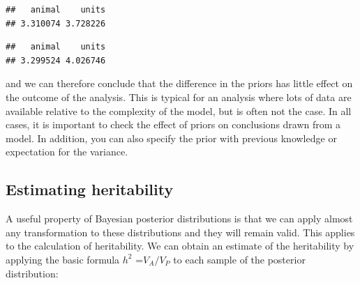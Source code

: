 \documentclass[
  12pt,
]{book}
\newenvironment{Shaded}{\begin{snugshade}}{\end{snugshade}}
\newcommand{\FloatTok}[1]{\textcolor[rgb]{0.00,0.00,0.81}{#1}}
\newcommand{\KeywordTok}[1]{\textcolor[rgb]{0.13,0.29,0.53}{\textbf{#1}}}
\newcommand{\NormalTok}[1]{#1}
\newcommand{\OperatorTok}[1]{\textcolor[rgb]{0.81,0.36,0.00}{\textbf{#1}}}
\newcommand{\StringTok}[1]{\textcolor[rgb]{0.31,0.60,0.02}{#1}}
\begin{document}
\begin{verbatim}
##   animal    units 
## 3.310074 3.728226
\end{verbatim}

\begin{Shaded}
\end{Shaded}

\begin{verbatim}
##   animal    units 
## 3.299524 4.026746
\end{verbatim}

and we can therefore conclude that the difference in the priors has little effect on the outcome of the analysis. This is typical for an analysis where lots of data are available relative to the complexity of the model, but is often not the case. In all cases, it is important to check the effect of priors on conclusions drawn from a model. In addition, you can also specify the prior with previous knowledge or expectation for the variance.

\hypertarget{estimating-heritability-1}{%
\subsection{Estimating heritability}\label{estimating-heritability-1}}

A useful property of Bayesian posterior distributions is that we can apply almost any transformation to these distributions and they will remain valid. This applies to the calculation of heritability. We can obtain an estimate of the heritability by applying the basic formula \(h^2\) =\(V_A /V_P\) to each sample of the posterior distribution:

\begin{Shaded}
\end{Shaded}
\end{document}
